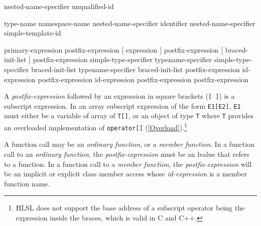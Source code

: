 
\begin{grammar}
  \br
  nested-name-specifier  unqualified-id\br

  \br
  \terminal{::}\br
  type-name \terminal{::}\br
  namespace-name \terminal{::}\br
  nested-name-specifier identifier \terminal{::}\br
  nested-name-specifier  simple-template-id \terminal{::}
\end{grammar}


\begin{grammar}
  \br
  primary-expression\br
  postfix-expression [ expression ]\br
  postfix-expression [ braced-init-list ]\br %
  postfix-expression \terminal{(}  \terminal{)}\br
  simple-type-specifier \terminal{(}  \terminal{)}\br
  typename-specifier \terminal{(}  \terminal{)}\br
  simple-type-specifier braced-init-list\br
  typename-specifier braced-init-list\br
  postfix-expression   id-expression\br
  postfix-expression \terminal{->}  id-expression\br
  postfix-expression \terminal{++}\br
  postfix-expression \terminal{--}
\end{grammar}


\p A \textit{postfix-expression} followed by an expression in square brackets
(\texttt{[ ]}) is a subscript expression. In an array subscript expression of
the form \texttt{E1[E2]}, \texttt{E1} must either be a variable of array of
\texttt{T[]}, or an object of type \texttt{T} where \texttt{T} provides an
overloaded implementation of \texttt{operator[]} (\ref{Overload}).\footnote{HLSL
does not support the base address of a subscript operator being the expression
inside the braces, which is valid in C and C++.}


\p A function call may be an \textit{ordinary function}, or a \textit{member
function}. In a function call to an \textit{ordinary function}, the
\textit{postfix-expression} must be an lvalue that refers to a function. In a
function call to a \textit{member function}, the \textit{postfix-expression}
will be an implicit or explicit class member access whose \textit{id-expression}
is a member function name.

